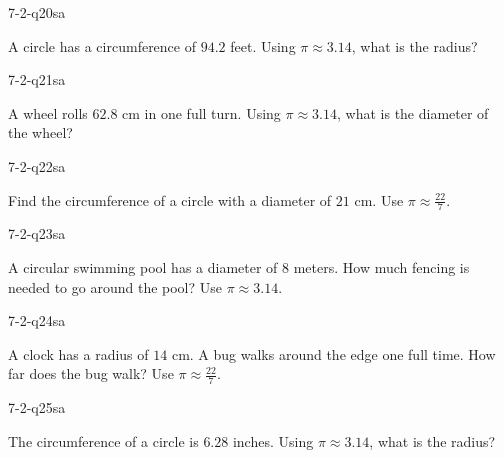 \begin{practiceQuestion}{7-2-q20}{sa}
\begin{questionText}
A circle has a circumference of $94.2$ feet. Using $\pi \approx 3.14$, what is the radius?
\end{questionText}
\end{practiceQuestion}

\begin{practiceQuestion}{7-2-q21}{sa}
\begin{questionText}
A wheel rolls $62.8$ cm in one full turn. Using $\pi \approx 3.14$, what is the diameter of the wheel?
\end{questionText}
\end{practiceQuestion}

\begin{practiceQuestion}{7-2-q22}{sa}
\begin{questionText}
Find the circumference of a circle with a diameter of $21$ cm. Use $\pi \approx \frac{22}{7}$.
\end{questionText}
\end{practiceQuestion}

\begin{practiceQuestion}{7-2-q23}{sa}
\begin{questionText}
A circular swimming pool has a diameter of $8$ meters. How much fencing is needed to go around the pool? Use $\pi \approx 3.14$.
\end{questionText}
\end{practiceQuestion}

\begin{practiceQuestion}{7-2-q24}{sa}
\begin{questionText}
A clock has a radius of $14$ cm. A bug walks around the edge one full time. How far does the bug walk? Use $\pi \approx \frac{22}{7}$.
\end{questionText}
\end{practiceQuestion}

\begin{practiceQuestion}{7-2-q25}{sa}
\begin{questionText}
The circumference of a circle is $6.28$ inches. Using $\pi \approx 3.14$, what is the radius?
\end{questionText}
\end{practiceQuestion}

